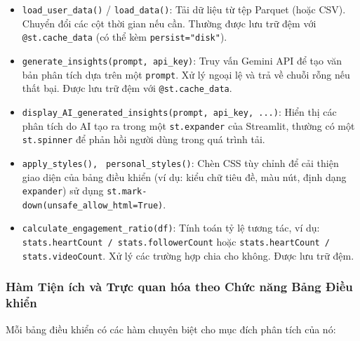 \begin{itemize}
    \item \texttt{load\_user\_data()} / \texttt{load\_data()}: Tải dữ liệu từ tệp Parquet (hoặc CSV). Chuyển đổi các cột thời gian nếu cần. Thường được lưu trữ đệm với \texttt{@st.cache\_data} (có thể kèm \texttt{persist="disk"}).
    
    \item \texttt{generate\_insights(prompt, api\_key)}: Truy vấn Gemini API để tạo văn bản phân tích dựa trên một \texttt{prompt}. Xử lý ngoại lệ và trả về chuỗi rỗng nếu thất bại. Được lưu trữ đệm với \texttt{@st.cache\_data}.
    
    \item \texttt{display\_AI\_generated\_insights(prompt, api\_key, ...)}: Hiển thị các phân tích do AI tạo ra trong một \texttt{st.expander} của Streamlit, thường có một \texttt{st.spinner} để phản hồi người dùng trong quá trình tải.
    
    \item \texttt{apply\_styles(), } \texttt{personal\_styles()}: Chèn CSS tùy chỉnh để cải thiện giao diện của bảng điều khiển (ví dụ: kiểu chữ tiêu đề, màu nút, định dạng \texttt{expander}) sử dụng \texttt{st.mark-\\down(unsafe\_allow\_html=True)}.
    
    \item \texttt{calculate\_engagement\_ratio(df)}: Tính toán tỷ lệ tương tác, ví dụ: \texttt{stats.heartCount / stats.followerCount} hoặc \texttt{stats.heartCount / stats.videoCount}. Xử lý các trường hợp chia cho không. Được lưu trữ đệm.
\end{itemize}

\subsubsection{Hàm Tiện ích và Trực quan hóa theo Chức năng Bảng Điều khiển}

\noindent
Mỗi bảng điều khiển có các hàm chuyên biệt cho mục đích phân tích của nó:

